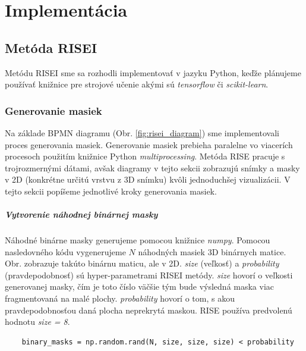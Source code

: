 \chapter{Implementácia}

\section{Metóda RISEI}

Metódu RISEI sme sa rozhodli implementovať v jazyku Python, keďže plánujeme používať knižnice pre strojové učenie akými sú \textit{tensorflow} či \textit{scikit-learn}.

\subsection{Generovanie masiek}

Na základe BPMN diagramu (Obr. \ref{fig:risei_diagram}) sme implementovali proces generovania masiek. Generovanie masiek prebieha paralelne vo viacerích procesoch použitím knižnice Python \textit{multiprocessing}. Metóda RISE pracuje s trojrozmernými dátami, avšak diagramy v tejto sekcii zobrazujú snímky a masky v 2D (konkrétne určitú vrstvu z 3D snímku) kvôli jednoduchšej vizualizácii. V tejto sekcii popíšeme jednotlivé kroky generovania masiek.

\paragraph{Vytvorenie náhodnej binárnej masky}

Náhodné binárne masky generujeme pomocou knižnice \textit{numpy}. Pomocou nasledovného kódu vygenerujeme $N$ náhodných masiek 3D binárnych matice. Obr. \label{fig:risei_inpainting_example} zobrazuje takúto binárnu maticu, ale v 2D. \textit{size} (veľkosť) a \textit{probability} (pravdepodobnosť) sú hyper-parametrami RISEI metódy. \textit{size} hovorí o veľkosti generovanej masky, čím je toto číslo väčšie tým bude výsledná maska viac fragmentovaná na malé plochy. \textit{probability} hovorí o tom, s akou pravdepodobnosťou daná plocha neprekrytá maskou. RISE používa predvolenú hodnotu \textit{size = 8}.

\begin{lstlisting}
    binary_masks = np.random.rand(N, size, size, size) < probability
\end{lstlisting}

